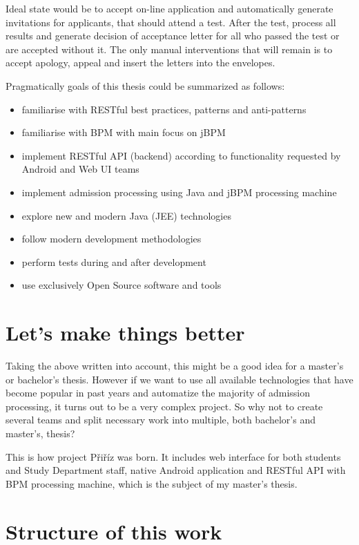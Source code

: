 \begin{introduction}
	Ideal state would be to accept on-line application and automatically generate invitations for applicants, that should
	attend a test. After the test, process all results and generate decision of acceptance letter for all who passed the
	test or are accepted without it. The only manual interventions that will remain is to accept apology, appeal and insert
	the letters into the envelopes.

	Pragmatically goals of this thesis could be summarized as follows:
	
	\begin{itemize}
	  \item familiarise with RESTful best practices, patterns and anti-patterns
	  \item familiarise with BPM with main focus on jBPM
	  \item implement RESTful \gls{API} (backend) according to functionality requested by Android and Web UI teams
	  \item implement admission processing using Java and jBPM processing machine
	  \item explore new and modern Java (JEE) technologies
	  \item follow modern development methodologies
	  \item perform tests during and after development
	  \item use exclusively Open Source software and tools
	\end{itemize}
	
	\section{Let's make things better}
	
	Taking the above written into account, this might be a good idea for a master's or bachelor's thesis. However if we
	want to use all available technologies that have become popular in past years and automatize the majority of admission
	processing, it turns out to be a very complex project. So why not to create several teams and split necessary work into
	multiple, both bachelor's and master's, thesis?
	
	This is how project Přiříz was born. It includes web interface for both students and Study Department staff, native
	Android application and RESTful \gls{API} with BPM processing machine, which is the subject of my master's thesis.
	
	\section{Structure of this work}
	

\end{introduction}
